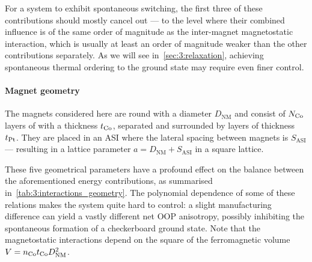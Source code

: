 For a system to exhibit spontaneous switching, the first three of these contributions should mostly cancel out --- to the level where their combined influence is of the same order of magnitude as the inter-magnet magnetostatic interaction, which is usually at least an order of magnitude weaker than the other contributions separately.
As we will see in~\cref{sec:3:relaxation}, achieving spontaneous thermal ordering to the ground state may require even finer control.

\paragraph{Magnet geometry}
\label{sec:3:OOP_geometry}

The magnets considered here are round with a diameter $D_\mathrm{NM}$ and consist of $N_{\ce{Co}}$ layers of  with a thickness $t_{\ce{Co}}$, separated and surrounded by  layers of thickness $t_{\ce{Pt}}$.
They are placed in an ASI where the lateral spacing between magnets is $S_\mathrm{ASI}$ --- resulting in a lattice parameter $a=D_\mathrm{NM}+S_\mathrm{ASI}$ in a square lattice. \par
These five geometrical parameters have a profound effect on the balance between the aforementioned energy contributions, as summarised in~\cref{tab:3:interactions_geometry}.
The polynomial dependence of some of these relations makes the system quite hard to control: a slight manufacturing difference can yield a vastly different net OOP anisotropy, possibly inhibiting the spontaneous formation of a checkerboard ground state.
Note that the magnetostatic interactions depend on the square of the ferromagnetic volume $V=n_{\ce{Co}} t_{\ce{Co}} D_\mathrm{NM}^2$.


